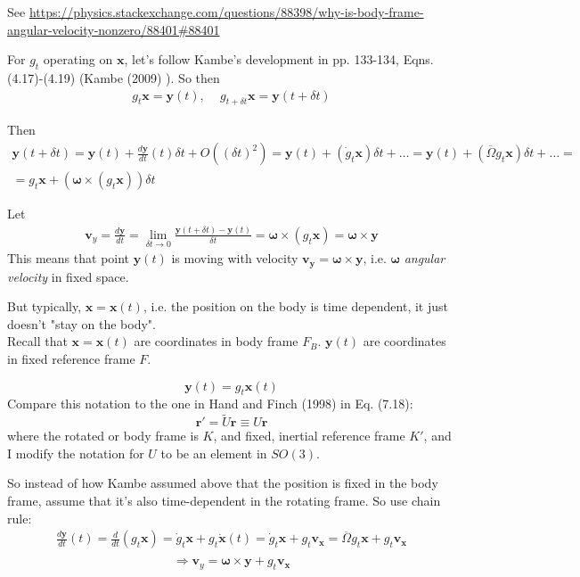 \documentclass[10pt]{amsart}
\begin{document}
\begin{multicols*}{2}
See \url{https://physics.stackexchange.com/questions/88398/why-is-body-frame-angular-velocity-nonzero/88401#88401}



For $g_t$ operating on $\mathbf{x}$, let's follow Kambe's development in pp. 133-134, Eqns. (4.17)-(4.19) (Kambe (2009) \cite{TKambe2009}). So then
\[
\begin{gathered}
g_t \mathbf{x} = \mathbf{y}(t), \quad \, g_{t+\delta t} \mathbf{x} = \mathbf{y}(t+\delta t)
\end{gathered}
\]

Then
\[
\begin{gathered}
\mathbf{y}(t+ \delta t) = \mathbf{y}(t) + \frac{d\mathbf{y} }{dt} (t) \delta t + O( (\delta t)^2 ) = \mathbf{y}(t) + (\dot{g}_t \mathbf{x} ) \delta t + \dots = \mathbf{y}(t) + (\overline{\Omega} g_t \mathbf{x}) \delta t + \dots = \\
 = g_t \mathbf{x} + ( \mathbf{\omega} \times (g_t \mathbf{x} ) ) \delta t
\end{gathered}
\]

Let 
\[
\begin{gathered}
\mathbf{v}_y = \frac{ d\mathbf{y}}{dt} = \lim_{ \delta t \to 0} \frac{ \mathbf{y}(t+ \delta t) - \mathbf{y}(t) }{ \delta t} = \mathbf{\omega} \times (g_t \mathbf{x} ) = \mathbf{\omega} \times \mathbf{y}
\end{gathered}
\]
This means that point $\mathbf{y}(t)$ is moving with velocity $\mathbf{v}_{\mathbf{y}} = \mathbf{\omega} \times \mathbf{y}$, i.e. $\mathbf{\omega}$ \emph{angular velocity} in fixed space.

But typically, $\mathbf{x} = \mathbf{x}(t)$, i.e. the position on the body is time dependent, it just doesn't "stay on the body". \\

Recall that $\mathbf{x} = \mathbf{x}(t)$ are coordinates in body frame $F_B$. $\mathbf{y}(t)$ are coordinates in fixed reference frame $F$.

\[
\mathbf{y}(t) = g_t \mathbf{x}(t)
\]
Compare this notation to the one in Hand and Finch (1998) \cite{HaFi1998} in Eq. (7.18):
\[
\mathbf{r}' = \widetilde{U} \mathbf{r} \equiv U \mathbf{r}
\]
where the rotated or body frame is $K$, and fixed, inertial reference frame $K'$, and I modify the notation for $U$ to be an element in $SO(3)$.

So instead of how Kambe assumed above that the position is fixed in the body frame, assume that it's also time-dependent in the rotating frame. So use chain rule:
\[
\begin{gathered}
\frac{d \mathbf{y}}{dt}(t) = \frac{d}{dt}(g_t \mathbf{x} ) = \dot{g}_t \mathbf{x} + g_t \dot{\mathbf{x}}(t) = \dot{g}_t \mathbf{x} + g_t \mathbf{v}_{\mathbf{x} } = \overline{\Omega} g_t \mathbf{x} + g_t \mathbf{v}_{\mathbf{x}} \\
\end{gathered}
\]
\begin{equation}\label{Eq:VelocityTransformationFromRotatingFrame}
	\Longrightarrow \mathbf{v}_y = \mathbf{\omega} \times \mathbf{y} + g_t \mathbf{v}_{\mathbf{x}}
\end{equation}


\end{multicols*}
\end{document}
